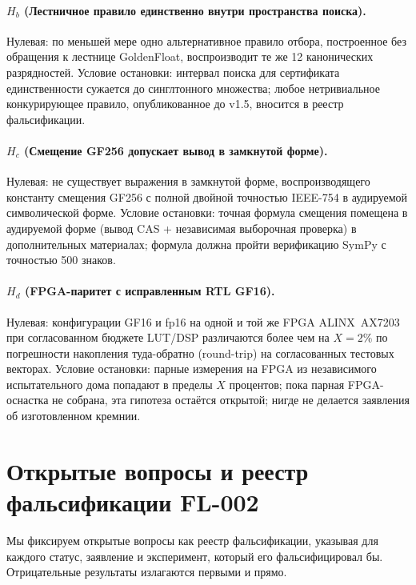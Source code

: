 \documentclass[11pt,a4paper]{article}
\theoremstyle{plain}
\begin{document}
\paragraph{$H_b$ (Лестничное правило единственно внутри пространства поиска).}
Нулевая: по меньшей мере одно альтернативное правило отбора, построенное без
обращения к лестнице GoldenFloat, воспроизводит те же 12 канонических
разрядностей. Условие остановки: интервал поиска для сертификата единственности
сужается до синглтонного множества; любое нетривиальное конкурирующее правило,
опубликованное до v1.5, вносится в реестр фальсификации.

\paragraph{$H_c$ (Смещение GF256 допускает вывод в замкнутой форме).}
Нулевая: не существует выражения в замкнутой форме, воспроизводящего константу
смещения GF256 с полной двойной точностью IEEE-754 в аудируемой символической
форме. Условие остановки: точная формула смещения помещена в аудируемой форме
(вывод CAS + независимая выборочная проверка) в дополнительных материалах;
формула должна пройти верификацию SymPy с точностью 500 знаков.

\paragraph{$H_d$ (FPGA-паритет с исправленным RTL GF16).}
Нулевая: конфигурации GF16 и fp16 на одной и той же FPGA ALINX~AX7203
при согласованном бюджете LUT/DSP различаются более чем
на \(X = 2\%\) по погрешности накопления туда-обратно (round-trip) на
согласованных тестовых векторах. Условие остановки: парные измерения на FPGA
из независимого испытательного дома попадают в пределы \(X\) процентов; пока
парная FPGA-оснастка не собрана, эта гипотеза остаётся открытой; нигде не
делается заявления об изготовленном кремнии.

\section{Открытые вопросы и реестр фальсификации FL-002}\label{sec:ledger}

Мы фиксируем открытые вопросы как реестр фальсификации, указывая для каждого
статус, заявление и эксперимент, который его фальсифицировал бы. Отрицательные
результаты излагаются первыми и прямо.
\end{document}
